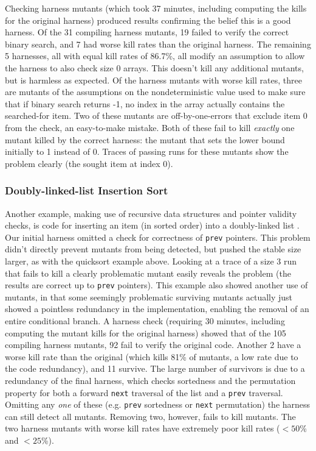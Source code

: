 \documentclass{svjour3}
\begin{document}
Checking harness mutants (which took 37 minutes, including computing
the kills for the original harness) produced results confirming the belief this is a
good harness.  Of the 31 compiling harness mutants, 19 failed to verify
the correct binary search, and 7 had worse kill rates than the
original harness.  The remaining 5 harnesses, all with equal kill
rates of 86.7\%, all modify an assumption to allow the harness to also
check size 0 arrays.  This doesn't kill any additional mutants, but is
harmless as expected.  Of the harness mutants with worse kill rates,
three are mutants of the assumptions on the nondeterministic value used to
make sure that if binary search returns -1, no index in the array
actually contains the searched-for item.  Two of these mutants are
off-by-one-errors that exclude item 0 from the check, an easy-to-make
mistake.  Both of these fail to kill \emph{exactly} one mutant killed by the
correct harness: the mutant that sets the lower bound
initially to 1 instead of 0.  Traces of passing runs for these mutants show the
problem clearly (the sought item at index 0).

\subsubsection{Doubly-linked-list Insertion Sort}

Another example, making use of recursive data structures and pointer
validity checks, is code for inserting an item (in
sorted order) into a doubly-linked list \cite{DLLInsert}.  Our initial
harness omitted a check for correctness of {\tt prev} pointers.  This
problem didn't directly prevent mutants from being detected, but
pushed the stable size larger, as with the quicksort example above.
Looking at a trace of a size 3 run that fails to kill a clearly
problematic mutant easily reveals the problem (the results are correct
up to {\tt prev} pointers).  This example also showed another use of
mutants, in that some seemingly problematic surviving mutants actually
just showed a pointless redundancy in the implementation, enabling the
removal of an entire conditional branch.  A harness check (requiring
30 minutes, including computing the mutant kills for the original
harness) showed that of the 105 compiling harness mutants, 92 fail to
verify the original code.  Another 2 have a worse kill rate than the
original (which kills 81\% of mutants, a low rate due to the code
redundancy), and 11 survive.  The large number of survivors is due to
a redundancy of the final harness, which checks sortedness and the
permutation property for both a forward {\tt next} traversal of the
list and a {\tt prev} traversal.  Omitting any \emph{one} of these
(e.g. {\tt prev} sortedness or {\tt next} permutation) the harness can
still detect all mutants.  Removing two, however, fails to kill
mutants.  The two harness mutants with worse kill rates have extremely poor
kill rates ($<50$\% and $<25$\%).
\end{document}

